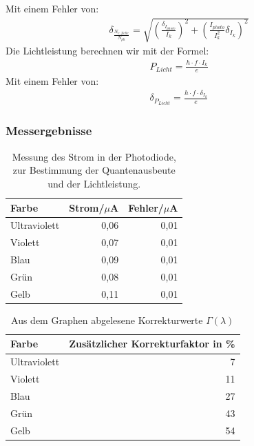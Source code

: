 \documentclass[12px]{scrartcl}
\begin{document}
Mit einem Fehler von:
\begin{align}
\delta_{\frac{N_{e,Zelle}}{N_{ph}}} = \sqrt{
\left(\frac{\delta_{I_{photo}}}{I_{k}}\right)^2+
\left(\frac{I_{photo}}{I_{k}^2}\delta_{I_{k}}\right)^2}
\end{align}
Die Lichtleistung berechnen wir mit der Formel:
\begin{align}
P_{Licht} = \frac{h\cdot f\cdot I_k}{e}
\label{eqn:p_l}
\end{align}
Mit einem Fehler von:
\begin{align}
\delta_{P_{Licht}} = \frac{h\cdot f\cdot \delta_{I_k}}{e}
\label{eqn:p_l_delta}
\end{align}

\subsubsection{Messergebnisse}
\begin{table}[H]
\caption{Messung des Strom in der Photodiode, zur Bestimmung der Quantenausbeute und der Lichtleistung.}
\begin{center}
\begin{tabular}{|l|r|r|}
\hline
Farbe & \multicolumn{1}{l|}{Strom/$\mu$A} & \multicolumn{1}{l|}{Fehler/$\mu$A} \\ \hline
Ultraviolett & 0,06 & 0,01 \\ \hline
Violett & 0,07 & 0,01 \\ \hline
Blau & 0,09 & 0,01 \\ \hline
Grün & 0,08 & 0,01 \\ \hline
Gelb & 0,11 & 0,01 \\ \hline
\end{tabular}
\end{center}
\label{tab:a_2.3}
\end{table}

\begin{table}[H]
\caption{Aus dem Graphen abgelesene Korrekturwerte $\Gamma(\lambda)$}
\begin{center}
\begin{tabular}{|l|r|}
\hline
Farbe & \multicolumn{1}{l|}{Zusätzlicher Korrekturfaktor in \%} \\ \hline
Ultraviolett & 7 \\ \hline
Violett & 11 \\ \hline
Blau & 27 \\ \hline
Grün & 43 \\ \hline
Gelb & 54 \\ \hline
\end{tabular}
\end{center}
\label{tab:a_2_3_k}
\end{table}
\end{document}

